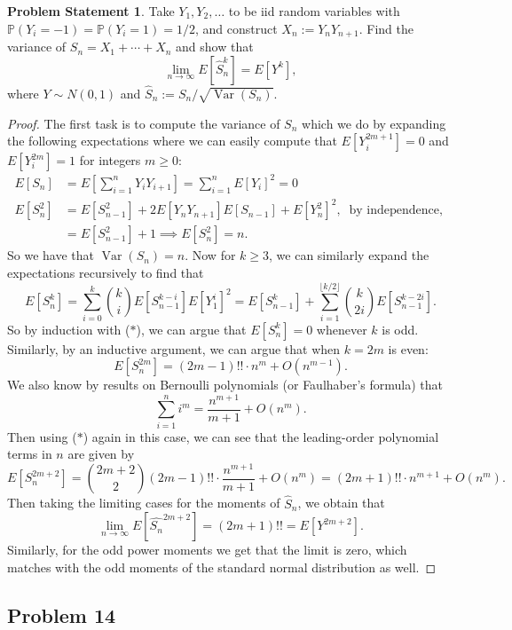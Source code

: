 \documentclass[12pt,reqno]{article}
\theoremstyle{plain}
\theoremstyle{definition}
\newtheorem{problem}[theorem]{Problem Statement}
\newcommand{\PP}[1]{\ensuremath{\mathbb{P}\left(#1\right)}}
\begin{document}
\begin{problem}
Take $Y_1,Y_2,\ldots$ to be iid random variables with 
$\PP{Y_i=-1} = \PP{Y_i=1} = 1/2$, and construct $X_n := Y_nY_{n+1}$. 
Find the variance of $S_n = X_1+\cdots+X_n$ and show that 
\[
\lim_{n \rightarrow \infty} E[\hat{S}_n^k] = E[Y^k], 
\]
where $Y \sim N(0, 1)$ and 
$\hat{S}_n := S_n / \sqrt{\operatorname{Var}(S_n)}$. 
\end{problem}
\begin{proof}
The first task is to compute the variance of $S_n$ which we do by 
expanding the following expectations where we can easily compute that 
$E[Y_i^{2m+1}] = 0$ and $E[Y_i^{2m}]=1$ for integers $m \geq 0$:
\begin{align*} 
E[S_n] & = E\left[\sum_{i=1}^n Y_iY_{i+1}\right] = 
     \sum_{i=1}^n E[Y_i]^2 = 0 \\ 
E[S_n^2] & = E[S_{n-1}^2] + 2E[Y_nY_{n+1}] E[S_{n-1}] + E[Y_n^2]^2,\ 
     \text{ by independence, } \\ 
     & = E[S_{n-1}^2] + 1 
     \implies E[S_n^2] = n. 
\end{align*} 
So we have that $\operatorname{Var}(S_n) = n$. 
Now for $k \geq 3$, we can similarly expand the expectations recursively 
to find that 
\begin{equation} 
\tag{$\ast$} 
E[S_n^k] = \sum_{i=0}^k \binom{k}{i} E[S_{n-1}^{k-i}] E[Y_1^i]^2 = 
     E[S_{n-1}^k] + \sum_{i=1}^{\lfloor k/2 \rfloor} \binom{k}{2i} 
     E[S_{n-1}^{k-2i}].
\end{equation} 
So by induction with ($\ast$), we can argue that $E[S_n^k] = 0$ whenever 
$k$ is odd. Similarly, by an inductive argument, we can argue that when 
$k = 2m$ is even:
\[
E[S_n^{2m}] = (2m-1)!! \cdot n^m + O(n^{m-1}). 
\]
We also know by results on Bernoulli polynomials (or Faulhaber's formula) 
that 
\[
\sum_{i=1}^n i^m = \frac{n^{m+1}}{m+1} + O(n^m). 
\]
Then using ($\ast$) again in this case, we can see that the leading-order 
polynomial terms in $n$ are given by 
\[
E[S_n^{2m+2}] = \binom{2m+2}{2} (2m-1)!! \cdot \frac{n^{m+1}}{m+1} + 
     O(n^m) = (2m+1)!! \cdot n^{m+1} + O(n^m). 
\]
Then taking the limiting cases for the moments of $\hat{S}_n$, we obtain that 
\[
\lim_{n \rightarrow \infty} E[\hat{S_n}^{2m+2}] = (2m+1)!! = 
     E[Y^{2m+2}]. 
\]
Similarly, for the odd power moments we get that the limit is zero, which 
matches with the odd moments of the standard normal distribution as well. 
\end{proof} 

\subsection{Problem 14}
\end{document}
